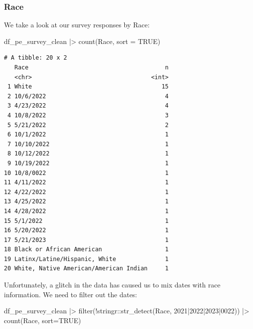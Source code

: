 \documentclass[
  letterpaper,
  DIV=11,
  numbers=noendperiod]{scrartcl}
\newenvironment{Shaded}{\begin{snugshade}}{\end{snugshade}}
\newcommand{\AttributeTok}[1]{\textcolor[rgb]{0.40,0.45,0.13}{#1}}
\newcommand{\ConstantTok}[1]{\textcolor[rgb]{0.56,0.35,0.01}{#1}}
\newcommand{\FunctionTok}[1]{\textcolor[rgb]{0.28,0.35,0.67}{#1}}
\newcommand{\NormalTok}[1]{\textcolor[rgb]{0.00,0.23,0.31}{#1}}
\newcommand{\SpecialCharTok}[1]{\textcolor[rgb]{0.37,0.37,0.37}{#1}}
\newcommand{\StringTok}[1]{\textcolor[rgb]{0.13,0.47,0.30}{#1}}
\begin{document}
\hypertarget{race}{%
\subsubsection{Race}\label{race}}

We take a look at our survey responses by Race:

\begin{Shaded}
\begin{Highlighting}[]
\NormalTok{df\_pe\_survey\_clean }\SpecialCharTok{|\textgreater{}} 
  \FunctionTok{count}\NormalTok{(Race, }\AttributeTok{sort =} \ConstantTok{TRUE}\NormalTok{)}
\end{Highlighting}
\end{Shaded}

\begin{verbatim}
# A tibble: 20 x 2
   Race                                       n
   <chr>                                  <int>
 1 White                                     15
 2 10/6/2022                                  4
 3 4/23/2022                                  4
 4 10/8/2022                                  3
 5 5/21/2022                                  2
 6 10/1/2022                                  1
 7 10/10/2022                                 1
 8 10/12/2022                                 1
 9 10/19/2022                                 1
10 10/8/0022                                  1
11 4/11/2022                                  1
12 4/22/2022                                  1
13 4/25/2022                                  1
14 4/28/2022                                  1
15 5/1/2022                                   1
16 5/20/2022                                  1
17 5/21/2023                                  1
18 Black or African American                  1
19 Latinx/Latine/Hispanic, White              1
20 White, Native American/American Indian     1
\end{verbatim}

Unfortunately, a glitch in the data has caused us to mix dates with race
information. We need to filter out the dates:

\begin{Shaded}
\begin{Highlighting}[]
\NormalTok{df\_pe\_survey\_clean }\SpecialCharTok{|\textgreater{}} 
  \FunctionTok{filter}\NormalTok{(}\SpecialCharTok{!}\NormalTok{stringr}\SpecialCharTok{::}\FunctionTok{str\_detect}\NormalTok{(Race, }\StringTok{\textquotesingle{}2021|2022|2023|0022\textquotesingle{}}\NormalTok{)) }\SpecialCharTok{|\textgreater{}} 
  \FunctionTok{count}\NormalTok{(Race, }\AttributeTok{sort=}\ConstantTok{TRUE}\NormalTok{)}
\end{Highlighting}
\end{Shaded}
\end{document}
